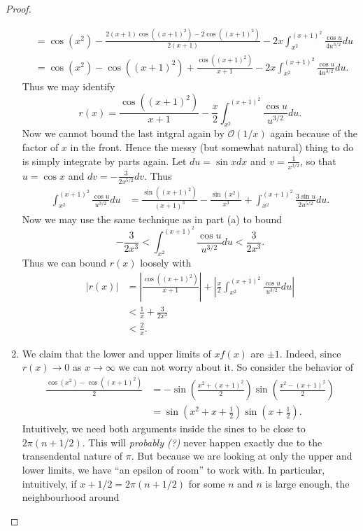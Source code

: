 \documentclass[12pt]{article}
\theoremstyle{remark}
\theoremstyle{named}
\newcommand{\abs}[1]{|#1|}
\newcommand{\bigabs}[1]{\left|#1\right|}
\begin{document}
\begin{proof}
\begin{enumerate}
\begin{align*}
            &= \cos(x^2) - \frac{2(x + 1)\cos((x + 1)^2) - 2\cos((x + 1)^2)}{2(x + 1)} - 2x\int_{x^2}^{(x + 1)^2}\frac{\cos u}{4 u^{3/2}}du \\
            &= \cos(x^2) - \cos((x + 1)^2) + \frac{\cos((x + 1)^2)}{x + 1} - 2x\int_{x^2}^{(x + 1)^2}\frac{\cos u}{4 u^{3/2}}du.
        \end{align*}
        Thus we may identify 
        \[r(x) = \frac{\cos((x + 1)^2)}{x + 1} - \frac{x}{2}\int_{x^2}^{(x + 1)^2}\frac{\cos u}{u^{3/2}}du.\]
        Now we cannot bound the last intgral again by \(\mathcal O (1/x)\) again because of the factor of \(x\) in the front. Hence the messy (but somewhat natural) thing to do is simply integrate by parts again. Let \(du = \sin x dx\) and \(v = \frac{1}{x^{3/2}}\), so that \(u = \cos x\) and \(dv = -\frac{3}{2x^{5/2}}dv\). Thus 
        \begin{align*}
            \int_{x^2}^{(x + 1)^2}\frac{\cos u}{u^{3/2}}du &= \frac{\sin((x + 1)^2)}{(x + 1)^3} -  \frac{\sin(x^2)}{x^3} + \int_{x^2}^{(x + 1)^2}\frac{3\sin u}{2 u^{5/2}}du.
        \end{align*}
        Now we may use the same technique as in part (a) to bound 
        \[-\frac{3}{2x^3} < \int_{x^2}^{(x + 1)^2}\frac{\cos u}{u^{3/2}}du < \frac{3}{2x^3}.\]
        Thus we can bound \(r(x)\) loosely with 
        \begin{align*}
            \abs{r(x)} &= \bigabs{\frac{\cos((x + 1)^2)}{x + 1}} + \bigabs{\frac{x}{2}\int_{x^2}^{(x + 1)^2}\frac{\cos u}{u^{3/2}}du} \\
            &< \frac{1}{x} + \frac{3}{2x^2} \\
            &< \frac{2}{x}.
        \end{align*}
        \item We claim that the lower and upper limits of \(xf(x)\) are \(\pm 1\). Indeed, since \(r(x) \to 0\) as \(x \to \infty\) we can not worry about it. So consider the behavior of 
        \begin{align*}
            \frac{\cos(x^2) - \cos((x + 1)^2)}{2} &= -\sin\left(\frac{x^2 + (x + 1)^2}{2}\right)\sin\left(\frac{x^2 - (x + 1)^2}{2}\right) \\
            &= \sin\left(x^2 + x + \frac 1 2\right)\sin\left(x + \frac 1 2\right).
        \end{align*}
        Intuitively, we need both arguments inside the sines to be close to \(2\pi (n + 1/2)\). This will \textit{probably (?)} never happen exactly due to the transendental nature of \(\pi\). But because we are looking at only the upper and lower limits, we have ``an epsilon of room'' to work with. In particular, intuitively, if \(x + 1/2 = 2 \pi (n + 1/2)\) for some \(n\) and \(n\) is large enough, the neighbourhood around 

\end{enumerate}
\end{proof}
\end{document}
